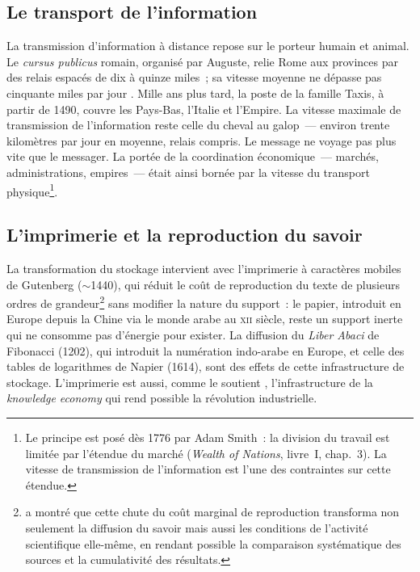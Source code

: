 \subsection{Le transport de l'information}\label{subsec:transport}

La transmission d'information à distance repose sur le porteur humain et animal. Le \emph{cursus publicus} romain, organisé par Auguste, relie Rome aux provinces par des relais espacés de dix à quinze miles~; sa vitesse moyenne ne dépasse pas cinquante miles par jour \parencite{kolb_transport_2000}. Mille ans plus tard, la poste de la famille Taxis, à partir de 1490, couvre les Pays-Bas, l'Italie et l'Empire. La vitesse maximale de transmission de l'information reste celle du cheval au galop~--- environ trente kilomètres par jour en moyenne, relais compris. Le message ne voyage pas plus vite que le messager. %
La portée de la coordination économique~--- marchés, administrations, empires~--- était ainsi bornée par la vitesse du transport physique\footnote{Le principe est posé dès 1776 par Adam Smith~: la division du travail est limitée par l'étendue du marché (\emph{Wealth of Nations}, livre~I, chap.~3). La vitesse de transmission de l'information est l'une des contraintes sur cette étendue.}.

\subsection{L'imprimerie et la reproduction du savoir}\label{subsec:imprimerie}

La transformation du stockage intervient avec l'imprimerie à caractères mobiles de Gutenberg ($\sim$1440), %
qui réduit le coût de reproduction du texte de plusieurs ordres de grandeur\footnote{\textcite{eisenstein_printing_1979} a montré que cette chute du coût marginal de reproduction transforma non seulement la diffusion du savoir mais aussi les conditions de l'activité scientifique elle-même, en rendant possible la comparaison systématique des sources et la cumulativité des résultats.} sans modifier la nature du support~: le papier, introduit en Europe depuis la Chine via le monde arabe au \textsc{xii}\ieme{} siècle, reste un support inerte qui ne consomme pas d'énergie pour exister. La diffusion du \emph{Liber Abaci} de Fibonacci (1202), qui introduit la numération indo-arabe en Europe, et celle des tables de logarithmes de Napier (1614), sont des effets de cette infrastructure de stockage. L'imprimerie est aussi, comme le soutient \textcite{mokyr_gifts_2002}, l'infrastructure de la \og \emph{knowledge economy}\fg{} qui rend possible la révolution industrielle.

